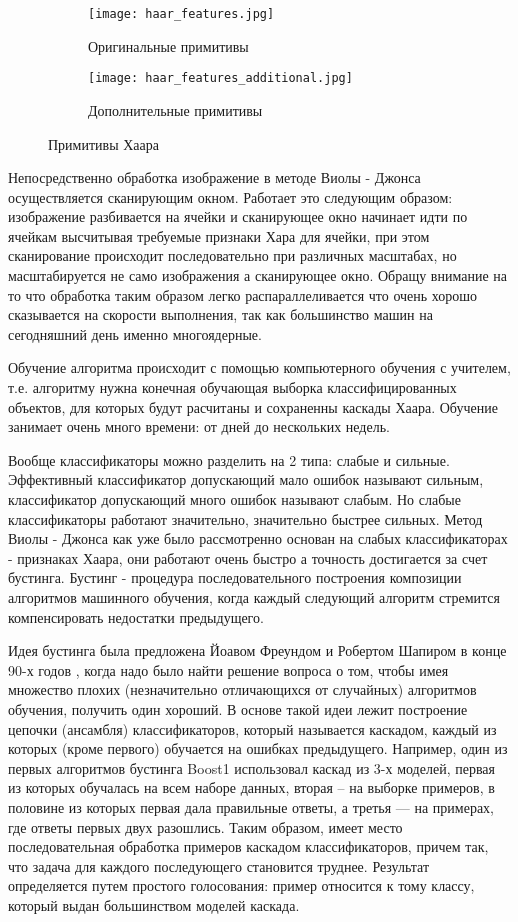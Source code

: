 \begin{figure}[ht]
\centering
  \begin{subfigure}[b]{0.4\textwidth} 
    \centering
    \texttt{[image: haar\_features.jpg]}  
    \caption{Оригинальные примитивы}
  \end{subfigure}
  \begin{subfigure}[b]{0.4\textwidth} 
    \centering
    \texttt{[image: haar\_features\_additional.jpg]}  
    \caption{Дополнительные примитивы}
  \end{subfigure}
  \caption{Примитивы Хаара}
  \label{fig:domain:search:violajones:haar_features}
\end{figure}

Непосредственно обработка изображение в методе Виолы - Джонса осуществляется сканирующим окном. Работает это следующим образом: изображение разбивается на ячейки и сканирующее окно начинает идти по ячейкам высчитывая требуемые признаки Хара для ячейки, при этом сканирование происходит последовательно при различных масштабах, но масштабируется не само изображения а сканирующее окно. Обращу внимание на то что обработка таким образом легко распараллеливается что очень хорошо сказывается на скорости выполнения, так как большинство машин на сегодняшний день именно многоядерные. 

Обучение алгоритма происходит с помощью компьютерного обучения с учителем, т.е. алгоритму нужна конечная обучающая выборка классифицированных объектов, для которых будут расчитаны и сохраненны каскады Хаара. Обучение занимает очень много времени: от дней до нескольких недель.

Вообще классификаторы можно разделить на 2 типа: слабые и сильные. Эффективный классификатор допускающий мало ошибок называют сильным, классификатор допускающий много ошибок называют слабым. Но слабые классификаторы работают значительно, значительно быстрее сильных. Метод Виолы - Джонса как уже было рассмотренно основан на слабых классификаторах - признаках Хаара, они работают очень быстро а точность достигается за счет бустинга. Бустинг - процедура последовательного построения композиции алгоритмов машинного обучения, когда каждый следующий алгоритм стремится компенсировать недостатки предыдущего. 

Идея бустинга была предложена Йоавом Фреундом и Робертом Шапиром в конце 90-х годов \cite{boosting}, когда надо было найти решение вопроса о том, чтобы имея множество плохих (незначительно отличающихся от случайных) алгоритмов обучения, получить один хороший. В основе такой идеи лежит построение цепочки (ансамбля) классификаторов, который называется каскадом, каждый из которых (кроме первого) обучается на ошибках предыдущего. 
Например, один из первых алгоритмов бустинга Boost1 использовал каскад из 3-х моделей, первая из которых обучалась на всем наборе данных, вторая – на выборке примеров, в половине из которых первая дала правильные ответы, а третья — на примерах, где ответы первых двух разошлись. Таким образом, имеет место последовательная обработка примеров каскадом классификаторов, причем так, что задача для каждого последующего становится труднее. Результат определяется путем простого голосования: пример относится к тому классу, который выдан большинством моделей каскада.

